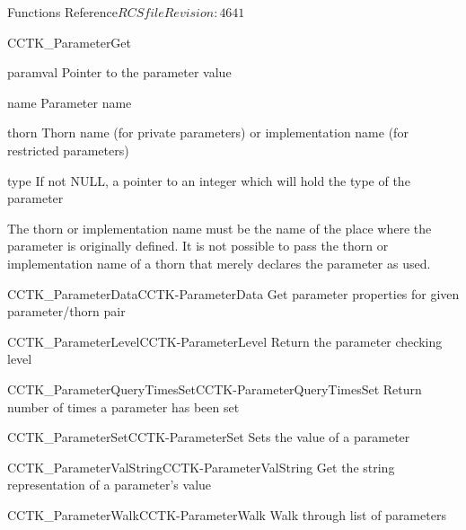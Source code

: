 \begin{cactuspart}{ Functions Reference}{$RCSfile$}{$Revision: 4641 $}
\begin{FunctionDescription}{CCTK\_ParameterGet}
\begin{ResultSection}
\begin{Result}{paramval}
Pointer to the parameter value
\end{Result}
\end{ResultSection}

\begin{ParameterSection}
\begin{Parameter}{name}
Parameter name
\end{Parameter}
\begin{Parameter}{thorn}
Thorn name (for private parameters) or implementation name (for
restricted parameters)
\end{Parameter}
\begin{Parameter}{type}
If not NULL, a pointer to an integer which will hold the type of the
parameter
\end{Parameter}
\end{ParameterSection}

\begin{Discussion}
The thorn or implementation name must be the name of the place where
the parameter is originally defined.  It is not possible to pass the
thorn or implementation name of a thorn that merely declares the
parameter as used.
\end{Discussion}

\begin{SeeAlsoSection}
\begin{SeeAlso2}{CCTK\_ParameterData}{CCTK-ParameterData}
  Get parameter properties for given parameter/thorn pair
\end{SeeAlso2}
\begin{SeeAlso2}{CCTK\_ParameterLevel}{CCTK-ParameterLevel}
  Return the parameter checking level
\end{SeeAlso2}
\begin{SeeAlso2}{CCTK\_ParameterQueryTimesSet}{CCTK-ParameterQueryTimesSet}
  Return number of times a parameter has been set
\end{SeeAlso2}
\begin{SeeAlso2}{CCTK\_ParameterSet}{CCTK-ParameterSet}
  Sets the value of a parameter
\end{SeeAlso2}
\begin{SeeAlso2}{CCTK\_ParameterValString}{CCTK-ParameterValString}
  Get the string representation of a parameter's value
\end{SeeAlso2}
\begin{SeeAlso2}{CCTK\_ParameterWalk}{CCTK-ParameterWalk}
  Walk through list of parameters
\end{SeeAlso2}
\end{SeeAlsoSection}


\end{FunctionDescription}
\end{cactuspart}

